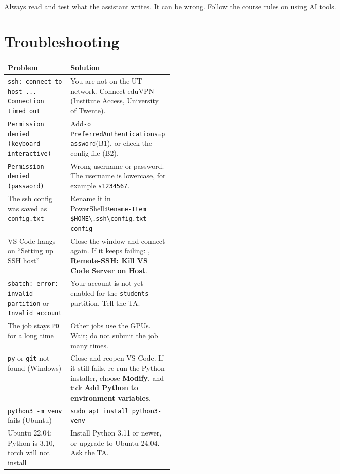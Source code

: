 \documentclass[11pt,a4paper]{article}
\newcommand{\key}[1]{\tcbox[on line, colback=tint, colframe=slate!60, boxrule=0.4pt, arc=0.8mm,
  left=0.8mm, right=0.8mm, top=0.2mm, bottom=0.2mm]{\small\ttfamily #1}}
\newcommand{\menu}[1]{\textsf{\textbf{#1}}}
\begin{document}
\begin{notebox}[Important]Always read and test what the assistant writes. It can be wrong. Follow the course rules on using AI tools.\end{notebox}

\section*{Troubleshooting}\label{sec:trouble}
\renewcommand{\arraystretch}{1.3}
\begin{tabularx}{\linewidth}{@{}>{\raggedright\arraybackslash}p{0.38\linewidth} X@{}}
\toprule
\textbf{Problem} & \textbf{Solution} \\
\midrule
\texttt{ssh: connect to host ... Connection timed out} & You are not on the UT network. Connect eduVPN (Institute Access, University of Twente). \\
\texttt{Permission denied (keyboard-interactive)} & Add\newline \texttt{-o PreferredAuthentications=password}\newline (B1), or check the config file (B2). \\
\texttt{Permission denied (password)} & Wrong username or password. The username is lowercase, for example \texttt{s1234567}. \\
The ssh config was saved as \texttt{config.txt} & Rename it in PowerShell:\newline \texttt{Rename-Item \$HOME\textbackslash.ssh\textbackslash config.txt config} \\
VS Code hangs on ``Setting up SSH host'' & Close the window and connect again. If it keeps failing: \key{Ctrl+Shift+P}, \menu{Remote-SSH: Kill VS Code Server on Host}. \\
\texttt{sbatch: error: invalid partition} or \texttt{Invalid account} & Your account is not yet enabled for the \texttt{students} partition. Tell the TA. \\
The job stays \texttt{PD} for a long time & Other jobs use the GPUs. Wait; do not submit the job many times. \\
\texttt{py} or \texttt{git} not found (Windows) & Close and reopen VS Code. If it still fails, re-run the Python installer, choose \menu{Modify}, and tick \menu{Add Python to environment variables}. \\
\texttt{python3 -m venv} fails (Ubuntu) & \texttt{sudo apt install python3-venv} \\
Ubuntu 22.04: Python is 3.10, torch will not install & Install Python 3.11 or newer, or upgrade to Ubuntu 24.04. Ask the TA. \\

\end{tabularx}
\end{document}
